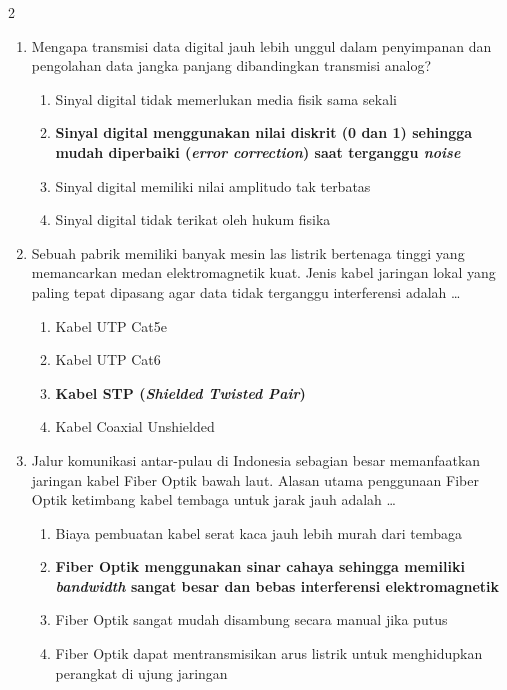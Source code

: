 \documentclass[10pt,a4paper]{article}
\begin{document}
\begin{multicols}{2}
\begin{enumerate}
    \item Mengapa transmisi data digital jauh lebih unggul dalam penyimpanan dan pengolahan data jangka panjang dibandingkan transmisi analog?
    \begin{enumerate}
        \item Sinyal digital tidak memerlukan media fisik sama sekali
        \item \textbf{Sinyal digital menggunakan nilai diskrit (0 dan 1) sehingga mudah diperbaiki (\emph{error correction}) saat terganggu \emph{noise}}
        \item Sinyal digital memiliki nilai amplitudo tak terbatas
        \item Sinyal digital tidak terikat oleh hukum fisika
    \end{enumerate}

    \item Sebuah pabrik memiliki banyak mesin las listrik bertenaga tinggi yang memancarkan medan elektromagnetik kuat. Jenis kabel jaringan lokal yang paling tepat dipasang agar data tidak terganggu interferensi adalah \dots
    \begin{enumerate}
        \item Kabel UTP Cat5e
        \item Kabel UTP Cat6
        \item \textbf{Kabel STP (\emph{Shielded Twisted Pair})}
        \item Kabel Coaxial Unshielded
    \end{enumerate}

    \item Jalur komunikasi antar-pulau di Indonesia sebagian besar memanfaatkan jaringan kabel Fiber Optik bawah laut. Alasan utama penggunaan Fiber Optik ketimbang kabel tembaga untuk jarak jauh adalah \dots
    \begin{enumerate}
        \item Biaya pembuatan kabel serat kaca jauh lebih murah dari tembaga
        \item \textbf{Fiber Optik menggunakan sinar cahaya sehingga memiliki \emph{bandwidth} sangat besar dan bebas interferensi elektromagnetik}
        \item Fiber Optik sangat mudah disambung secara manual jika putus
        \item Fiber Optik dapat mentransmisikan arus listrik untuk menghidupkan perangkat di ujung jaringan
    \end{enumerate}


\end{enumerate}
\end{multicols}
\end{document}
